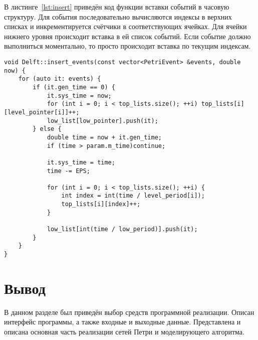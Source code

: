 В листинге~\ref{lst:insert} приведён код функции вставки событий в часовую структуру. Для события последовательно вычисляются индексы в верхних списках и инкрементируется счётчики в соответствующих ячейках. Для ячейки нижнего уровня происходит вставка в ей список событий. Если событие должно выполниться моментально, то просто происходит вставка по текущим индексам.

\begin{center}
	\captionsetup{justification=raggedright,singlelinecheck=off}
	\begin{lstlisting}[label=lst:insert,caption=Функция выполнения событий,showstringspaces=false]
void Delft::insert_events(const vector<PetriEvent> &events, double now) {
	for (auto it: events) {
		if (it.gen_time == 0) {
			it.sys_time = now;
			for (int i = 0; i < top_lists.size(); ++i) top_lists[i][level_pointer[i]]++;
			low_list[low_pointer].push(it);
		} else {
			double time = now + it.gen_time;
			if (time > param.m_time)continue;
			
			it.sys_time = time;
			time -= EPS;
			
			for (int i = 0; i < top_lists.size(); ++i) {
				int index = int(time / level_period[i]);
				top_lists[i][index]++;
			}
			
			low_list[int(time / low_period)].push(it);
		}
	}
}
	\end{lstlisting}
\end{center}
\FloatBarrier

\section*{Вывод}

В данном разделе был приведён выбор средств программной реализации. Описан интерфейс программы, а также входные и выходные данные. Представлена и описана основная часть реализации сетей Петри и моделирующего алгоритма.
